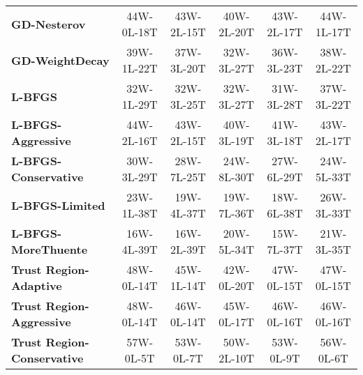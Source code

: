\documentclass[10pt]{article}
\begin{document}
\begin{table}[H]
{\begin{tabular}{lccccc}
\textbf{GD-Nesterov} & \textcolor{green!70!black}{44W-0L-18T} & \textcolor{green!70!black}{43W-2L-15T} & \textcolor{green!70!black}{40W-2L-20T} & \textcolor{green!70!black}{43W-2L-17T} & \textcolor{green!70!black}{44W-1L-17T} \\
\textbf{GD-WeightDecay} & \textcolor{green!70!black}{39W-1L-22T} & \textcolor{green!70!black}{37W-3L-20T} & \textcolor{green!70!black}{32W-3L-27T} & \textcolor{green!70!black}{36W-3L-23T} & \textcolor{green!70!black}{38W-2L-22T} \\
\textbf{L-BFGS} & \textcolor{green!70!black}{32W-1L-29T} & \textcolor{green!70!black}{32W-3L-25T} & \textcolor{green!70!black}{32W-3L-27T} & \textcolor{green!70!black}{31W-3L-28T} & \textcolor{green!70!black}{37W-3L-22T} \\
\textbf{L-BFGS-Aggressive} & \textcolor{green!70!black}{44W-2L-16T} & \textcolor{green!70!black}{43W-2L-15T} & \textcolor{green!70!black}{40W-3L-19T} & \textcolor{green!70!black}{41W-3L-18T} & \textcolor{green!70!black}{43W-2L-17T} \\
\textbf{L-BFGS-Conservative} & \textcolor{green!70!black}{30W-3L-29T} & \textcolor{green!70!black}{28W-7L-25T} & \textcolor{green!70!black}{24W-8L-30T} & \textcolor{green!70!black}{27W-6L-29T} & \textcolor{green!70!black}{24W-5L-33T} \\
\textbf{L-BFGS-Limited} & \textcolor{green!70!black}{23W-1L-38T} & \textcolor{green!70!black}{19W-4L-37T} & \textcolor{green!70!black}{19W-7L-36T} & \textcolor{green!70!black}{18W-6L-38T} & \textcolor{green!70!black}{26W-3L-33T} \\
\textbf{L-BFGS-MoreThuente} & \textcolor{green!70!black}{16W-4L-39T} & \textcolor{green!70!black}{16W-2L-39T} & \textcolor{green!70!black}{20W-5L-34T} & \textcolor{green!70!black}{15W-7L-37T} & \textcolor{green!70!black}{21W-3L-35T} \\
\textbf{Trust Region-Adaptive} & \textcolor{green!70!black}{48W-0L-14T} & \textcolor{green!70!black}{45W-1L-14T} & \textcolor{green!70!black}{42W-0L-20T} & \textcolor{green!70!black}{47W-0L-15T} & \textcolor{green!70!black}{47W-0L-15T} \\
\textbf{Trust Region-Aggressive} & \textcolor{green!70!black}{48W-0L-14T} & \textcolor{green!70!black}{46W-0L-14T} & \textcolor{green!70!black}{45W-0L-17T} & \textcolor{green!70!black}{46W-0L-16T} & \textcolor{green!70!black}{46W-0L-16T} \\
\textbf{Trust Region-Conservative} & \textcolor{green!70!black}{57W-0L-5T} & \textcolor{green!70!black}{53W-0L-7T} & \textcolor{green!70!black}{50W-2L-10T} & \textcolor{green!70!black}{53W-0L-9T} & \textcolor{green!70!black}{56W-0L-6T} \\

\end{tabular}}
\end{table}
\end{document}
